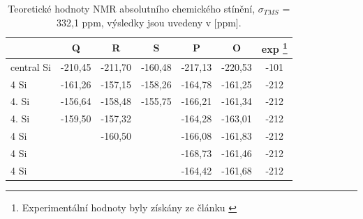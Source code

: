 \documentclass[
digital, %
table,   %
lof,     %
lot,     %
oneside,
]{fithesis3}
\begin{document}
\begin{table}[htbp]
\begin{minipage}{\textwidth}
\caption{Teoretické hodnoty NMR absolutního chemického stínění, $\sigma_{TMS}$ = 332,1 ppm, výsledky jsou uvedeny v [ppm].}
\begin{center}
\begin{tabular}{|l|c|c|c|c|c|c|}
\hline
\label{nmr} & \textbf{Q} & \textbf{R} &\textbf{S} & \textbf{P} & \textbf{O} & {exp \footnote{Experimentální hodnoty byly získány ze článku \cite{1316862}}} \\ \hline
central Si & -210,45 & -211,70 & -160,48 & -217,13 & -220,53 & -101 \\ \hline
4 Si & -161,26 & -157,15 &-158,26 & -164,78 & -161,25 & -212 \\ \hline
4. Si & -156,64 & -158,48 & -155,75 & -166,21 & -161,34 & -212 \\ \hline
4. Si & -159,50 & -157,32 &  & -164,28 & -163,01 & -212 \\ \hline
4 Si &  & -160,50 &  & -166,08 & -161,83 & -212 \\ \hline
4 Si &  &  &  & -168,73 & -161,46 & -212 \\ \hline
4 Si &  &  &  & -164,42 & -161,68 & -212 \\ \hline
\end{tabular}
\end{center}
\end{minipage}
\end{table}
\end{document}

